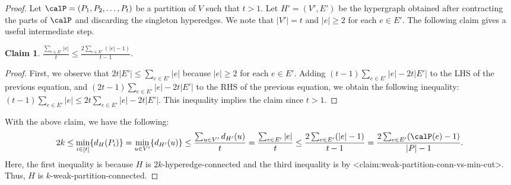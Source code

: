\documentclass{article}
\def\Cref#1{<#1>}%
\newtheorem{claim}{Claim}[section]
\newcommand{\shubhang}[1]{{\color{blue}[{\tiny Shubhang: \bf #1}]\marginpar{\color{blue}*}}}
\newcommand{\knote}[1]{{\color{red}[{\tiny Karthik: \bf #1}]\marginpar{\color{red}*}}}
\begin{document}
\begin{proof}
    Let $\calP = (P_1, P_2, \ldots, P_t)$ %
    be a partition of $V$ such that $t > 1$.
    Let $H' = (V', E')$ be the hypergraph obtained after contracting the parts of $\calP$ and discarding the singleton hyperedges. We note that $|V'| = t$ and $|e| \geq 2$ for each $e \in E'$. 
    The following claim gives a useful intermediate step.
    \begin{claim} \label{claim:weak-partition-conn-vs-min-cut}
        $\frac{\sum_{e \in E'}|e|}{t} \leq \frac{2\sum_{e \in E'}(|e| - 1)}{t - 1}.$
    \end{claim}
    \begin{proof}
    First, we observe that $2t|E'| \leq \sum_{e\in E'}|e|$ because $|e| \geq 2$ for each $e \in E'$.  
    Adding $(t-1)\sum_{e \in E'}|e| - 2t|E'|$ to the LHS of the previous equation, and $(2t-1)\sum_{e \in E'}|e| - 2t|E'|$ to the RHS of the previous equation, we obtain the following inequality: $(t-1)\sum_{e \in E'}|e| \leq 2t\sum_{e \in E'}|e| - 2t|E'|$.
    This inequality implies the claim since $t>1$. 
    \end{proof}
    With the above claim, we have the following:
$$2k \leq \min_{i \in [t]}\{d_{H}(P_i)\} 
            = \min_{u \in V'}\{d_{H'}(u)\}
            \leq \frac{\sum_{u \in V'}d_{H'}(u)}{t}
            = \frac{\sum_{e \in E'}|e|}{t}
            \leq \frac{2\sum_{e \in E'}(|e| - 1)}{t - 1}
            =  \frac{2\sum_{e \in E'}(\calP(e) - 1)}{|P| - 1}.$$
    Here, the first inequality is because $H$ is $2k$-hyperedge-connected and the third inequality is by \Cref{claim:weak-partition-conn-vs-min-cut}. Thus, $H$ is $k$-weak-partition-connected.
\end{proof}
\end{document}
